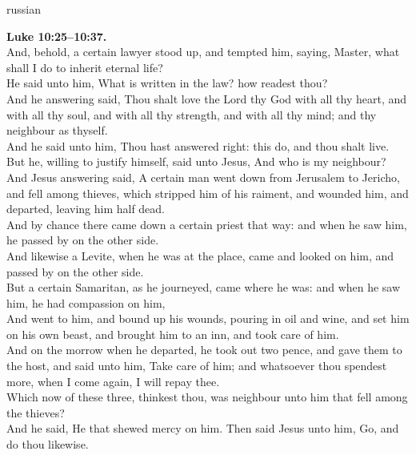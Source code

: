 \documentclass[10pt]{article} %
\begin{document}
{\begin{minipage}[t]{0.45\textwidth}
\begin{otherlanguage*}{russian}
\end{otherlanguage*}
\end{minipage}
\hfill
\begin{minipage}[t]{0.45\textwidth}

\textbf{Luke 10:25--10:37.}\\
And, behold, a certain lawyer stood up, and tempted him, saying, Master, what shall I do to inherit eternal life?\\
He said unto him, What is written in the law? how readest thou?\\
And he answering said, Thou shalt love the Lord thy God with all thy heart, and with all thy soul, and with all thy strength, and with all thy mind; and thy neighbour as thyself.\\
And he said unto him, Thou hast answered right: this do, and thou shalt live.\\
But he, willing to justify himself, said unto Jesus, And who is my neighbour?\\
And Jesus answering said, A certain man went down from Jerusalem to Jericho, and fell among thieves, which stripped him of his raiment, and wounded him, and departed, leaving him half dead.\\
And by chance there came down a certain priest that way: and when he saw him, he passed by on the other side.\\
And likewise a Levite, when he was at the place, came and looked on him, and passed by on the other side.\\
But a certain Samaritan, as he journeyed, came where he was: and when he saw him, he had compassion on him,\\
And went to him, and bound up his wounds, pouring in oil and wine, and set him on his own beast, and brought him to an inn, and took care of him.\\
And on the morrow when he departed, he took out two pence, and gave them to the host, and said unto him, Take care of him; and whatsoever thou spendest more, when I come again, I will repay thee.\\
Which now of these three, thinkest thou, was neighbour unto him that fell among the thieves?\\
And he said, He that shewed mercy on him. Then said Jesus unto him, Go, and do thou likewise.
\end{minipage}}
\vspace*{\fill}
\newpage
\Huge%
\vspace*{\fill}
\end{document}
